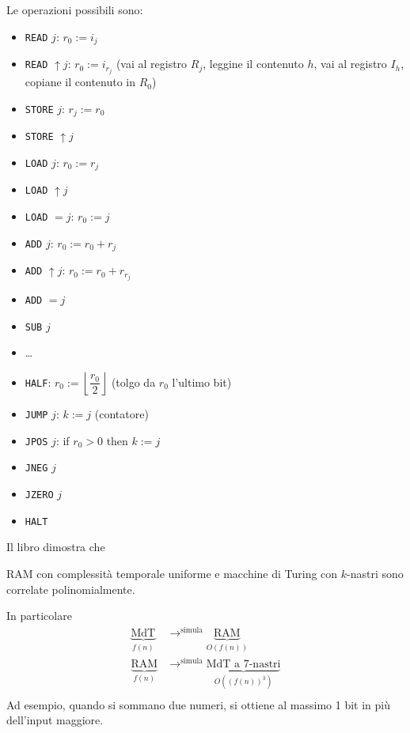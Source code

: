 \noindent Le operazioni possibili sono:
\begin{itemize}
    \item \texttt{READ} $j$: $r_0:=i_j$
    \item \texttt{READ} $\uparrow j$: $r_0:=i_{r_j}$ (vai al registro $R_j$, leggine il contenuto $h$, vai al registro $I_h$, copiane il contenuto in $R_0$)
    \item \texttt{STORE} $j$: $r_j:=r_0$
    \item \texttt{STORE} $\uparrow j$
    \item \texttt{LOAD} $j$: $r_0:=r_j$
    \item \texttt{LOAD} $\uparrow j$
    \item \texttt{LOAD} $=j$: $r_0:=j$
    \item \texttt{ADD} $j$: $r_0:=r_0+r_j$
    \item \texttt{ADD} $\uparrow j$: $r_0:=r_0+r_{r_j}$ 
    \item \texttt{ADD} $=j$
    \item \texttt{SUB} $j$
    \item \dots
    \item \texttt{HALF}: $r_0:=\left\lfloor \dfrac{r_0}{2} \right\rfloor$ (tolgo da $r_0$ l'ultimo bit)
    \item \texttt{JUMP} $j$: $k:=j$ (contatore)
    \item \texttt{JPOS} $j$: if $r_0>0$ then $k:=j$
    \item \texttt{JNEG} $j$
    \item \texttt{JZERO} $j$
    \item \texttt{HALT}
\end{itemize}
Il libro dimostra che
\begin{theorem}
    RAM con complessità temporale uniforme e macchine di Turing con $k$-nastri sono correlate polinomialmente.
\end{theorem}
In particolare 
\begin{align*}
    \underbrace{\text{MdT}}_{f(n)} &\to^{\text{simula}} \underbrace{\text{RAM}}_{O(f(n))}\\
    \underbrace{\text{RAM}}_{f(n)} &\to^{\text{simula}} \underbrace{\text{MdT a 7-nastri}}_{O((f(n))^3)}\\
\end{align*}
Ad esempio, quando si sommano due numeri, si ottiene al massimo 1 bit in più dell'input maggiore.

